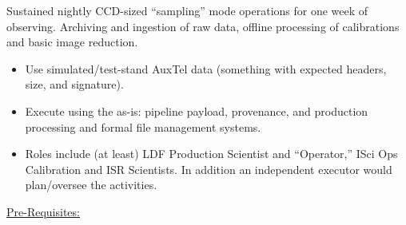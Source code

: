 Sustained nightly CCD-sized “sampling” mode operations for one week of 
observing.  Archiving and ingestion of raw data, offline processing of 
calibrations and basic image reduction.
\begin{itemize}
\item Use simulated/test-stand AuxTel data (something with expected 
headers, size, and signature).

\item Execute using the as-is: pipeline payload, provenance, and 
production processing and formal file management systems.

\item Roles include (at least) LDF Production Scientist and “Operator,” 
ISci Ops Calibration and ISR Scientists.  In addition an independent executor
would plan/oversee the activities.
\end{itemize}

\underline{Pre-Requisites:}

